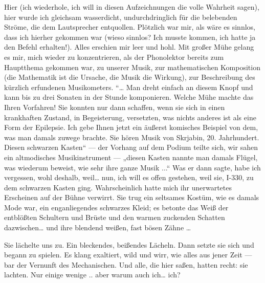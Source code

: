 Hier (ich wiederhole, ich will in diesen Aufzeichnungen die volle
Wahrheit sagen), hier wurde ich gleichsam wasserdicht,
undurchdringlich für die belebenden Ströme, die dem Lautsprecher
entquollen. Plötzlich war mir, als wäre es sinnlos, dass ich
hierher gekommen war (wieso sinnlos? Ich musste kommen, ich hatte
ja den Befehl erhalten!). Alles erschien mir leer und hohl. Mit
großer Mühe gelang es mir, mich wieder zu konzentrieren, als der
Phonolektor bereits zum Hauptthema gekommen war, zu unserer Musik,
zur mathematischen Komposition (die Mathematik ist die Ursache, die
Musik die Wirkung), zur Beschreibung des kürzlich erfundenen
Musikometers. “\ldots{} Man dreht einfach an diesem Knopf und kann bis
zu drei Sonaten in der Stunde komponieren. Welche Mühe machte das
Ihren Vorfahren! Sie konnten nur dann schaffen, wenn sie sich in
einen krankhaften Zustand, in
\glq{}Begeisterung\grq{}, versetzten, was nichts
anderes ist als eine Form der Epilepsie. Ich gebe Ihnen jetzt ein
äußerst komisches Beispiel von dem, was man damals zuwege brachte.
Sie hören Musik von Skrjabin, 20. Jahrhundert. Diesen schwarzen
Kasten“ — der Vorhang auf dem Podium teilte sich, wir sahen ein
altmodisches Musikinstrument — „diesen Kasten nannte man damals
Flügel, was wiederum beweist, wie sehr ihre ganze Musik ...“ Was er
dann sagte, habe ich vergessen, wohl deshalb, weil\ldots{} nun, ich will
es offen gestehen, weil sie, I-330, zu dem schwarzen Kasten ging.
Wahrscheinlich hatte mich ihr unerwartetes Erscheinen auf der Bühne
verwirrt. Sie trug ein seltsames Kostüm, wie es damals Mode war,
ein enganliegendes schwarzes Kleid; es betonte das Weiß der
entblößten Schultern und Brüste und den warmen zuckenden Schatten
dazwischen\ldots{} und ihre blendend weißen, fast bösen Zähne \ldots{}

Sie lächelte uns zu. Ein bleckendes, beißendes Lächeln. Dann setzte
sie sich und begann zu spielen. Es klang exaltiert, wild und wirr,
wie alles aus jener Zeit — bar der Vernunft des Mechanischen. Und
alle, die hier saßen, hatten recht: sie lachten. Nur einige wenige
.. aber warum auch ich\ldots{} ich?

